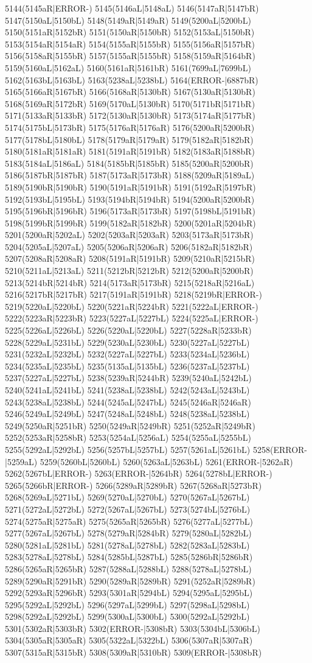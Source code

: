 5144(5145aR|ERROR-) 5145(5146aL|5148aL) 5146(5147aR|5147bR) 5147(5150aL|5150bL) 5148(5149aR|5149aR) 5149(5200aL|5200bL) 5150(5151aR|5152bR) 5151(5150aR|5150bR) 5152(5153aL|5150bR) 5153(5154aR|5154aR) 5154(5155aR|5155bR) 5155(5156aR|5157bR) 5156(5158aR|5155bR) 5157(5155aR|5155bR) 5158(5159aR|5164bR) 5159(5160aL|5162aL) 5160(5161aR|5161bR) 5161(7699aL|7699bL) 5162(5163bL|5163bL) 5163(5238aL|5238bL) 5164(ERROR-|6887bR) 5165(5166aR|5167bR) 5166(5168aR|5130bR) 5167(5130aR|5130bR) 5168(5169aR|5172bR) 5169(5170aL|5130bR) 5170(5171bR|5171bR) 5171(5133aR|5133bR) 5172(5130aR|5130bR) 5173(5174aR|5177bR) 5174(5175bL|5173bR) 5175(5176aR|5176aR) 5176(5200aR|5200bR) 5177(5178bL|5180bL) 5178(5179aR|5179aR) 5179(5182aR|5182bR) 5180(5181aR|5181aR) 5181(5191aR|5191bR) 5182(5183aR|5188bR) 5183(5184aL|5186aL) 5184(5185bR|5185bR) 5185(5200aR|5200bR) 5186(5187bR|5187bR) 5187(5173aR|5173bR) 5188(5209aR|5189aL) 5189(5190bR|5190bR) 5190(5191aR|5191bR) 5191(5192aR|5197bR) 5192(5193bL|5195bL) 5193(5194bR|5194bR) 5194(5200aR|5200bR) 5195(5196bR|5196bR) 5196(5173aR|5173bR) 5197(5198bL|5191bR) 5198(5199bR|5199bR) 5199(5182aR|5182bR) 5200(5201aR|5204bR) 5201(5200aR|5202aL) 5202(5203aR|5203aR) 5203(5173aR|5173bR) 5204(5205aL|5207aL) 5205(5206aR|5206aR) 5206(5182aR|5182bR) 5207(5208aR|5208aR) 5208(5191aR|5191bR) 5209(5210aR|5215bR) 5210(5211aL|5213aL) 5211(5212bR|5212bR) 5212(5200aR|5200bR) 5213(5214bR|5214bR) 5214(5173aR|5173bR) 5215(5218aR|5216aL) 5216(5217bR|5217bR) 5217(5191aR|5191bR) 5218(5219bR|ERROR-) 5219(5220aL|5220bL) 5220(5221aR|5224bR) 5221(5222aL|ERROR-) 5222(5223aR|5223bR) 5223(5227aL|5227bL) 5224(5225aL|ERROR-) 5225(5226aL|5226bL) 5226(5220aL|5220bL) 5227(5228aR|5233bR) 5228(5229aL|5231bL) 5229(5230aL|5230bL) 5230(5227aL|5227bL) 5231(5232aL|5232bL) 5232(5227aL|5227bL) 5233(5234aL|5236bL) 5234(5235aL|5235bL) 5235(5135aL|5135bL) 5236(5237aL|5237bL) 5237(5227aL|5227bL) 5238(5239aR|5244bR) 5239(5240aL|5242bL) 5240(5241aL|5241bL) 5241(5238aL|5238bL) 5242(5243aL|5243bL) 5243(5238aL|5238bL) 5244(5245aL|5247bL) 5245(5246aR|5246aR) 5246(5249aL|5249bL) 5247(5248aL|5248bL) 5248(5238aL|5238bL) 5249(5250aR|5251bR) 5250(5249aR|5249bR) 5251(5252aR|5249bR) 5252(5253aR|5258bR) 5253(5254aL|5256aL) 5254(5255aL|5255bL) 5255(5292aL|5292bL) 5256(5257bL|5257bL) 5257(5261aL|5261bL) 5258(ERROR-|5259aL) 5259(5260bL|5260bL) 5260(5263aL|5263bL) 5261(ERROR-|5262aR) 5262(5267bL|ERROR-) 5263(ERROR-|5264bR) 5264(5278bL|ERROR-) 5265(5266bR|ERROR-) 5266(5289aR|5289bR) 5267(5268aR|5273bR) 5268(5269aL|5271bL) 5269(5270aL|5270bL) 5270(5267aL|5267bL) 5271(5272aL|5272bL) 5272(5267aL|5267bL) 5273(5274bL|5276bL) 5274(5275aR|5275aR) 5275(5265aR|5265bR) 5276(5277aL|5277bL) 5277(5267aL|5267bL) 5278(5279aR|5284bR) 5279(5280aL|5282bL) 5280(5281aL|5281bL) 5281(5278aL|5278bL) 5282(5283aL|5283bL) 5283(5278aL|5278bL) 5284(5285bL|5287bL) 5285(5286bR|5286bR) 5286(5265aR|5265bR) 5287(5288aL|5288bL) 5288(5278aL|5278bL) 5289(5290aR|5291bR) 5290(5289aR|5289bR) 5291(5252aR|5289bR) 5292(5293aR|5296bR) 5293(5301aR|5294bL) 5294(5295aL|5295bL) 5295(5292aL|5292bL) 5296(5297aL|5299bL) 5297(5298aL|5298bL) 5298(5292aL|5292bL) 5299(5300aL|5300bL) 5300(5292aL|5292bL) 5301(5302aR|5303bR) 5302(ERROR-|5308bR) 5303(5304bL|5306bL) 5304(5305aR|5305aR) 5305(5322aL|5322bL) 5306(5307aR|5307aR) 5307(5315aR|5315bR) 5308(5309aR|5310bR) 5309(ERROR-|5308bR) 